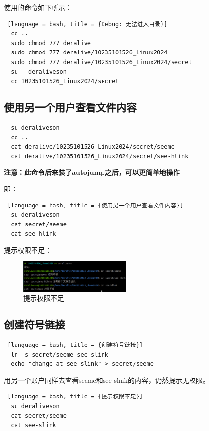 \documentclass[14pt,a4paper,UTF8,twoside]{article}
\begin{document}
使用的命令如下所示：

\begin{lstlisting} [language = bash, title = {Debug: 无法进入目录}]
  cd ..
  sudo chmod 777 deralive
  sudo chmod 777 deralive/10235101526_Linux2024
  sudo chmod 777 deralive/10235101526_Linux2024/secret
  su - deraliveson
  cd 10235101526_Linux2024/secret
\end{lstlisting}

\subsection{使用另一个用户查看文件内容}

\begin{lstlisting}
  su deraliveson
  cd ..
  cat deralive/10235101526_Linux2024/secret/seeme
  cat deralive/10235101526_Linux2024/secret/see-hlink
\end{lstlisting}

\textbf{注意：此命令后来装了autojump之后，可以更简单地操作}

即：

\begin{lstlisting} [language = bash, title = {使用另一个用户查看文件内容}]
  su deraliveson
  cat secret/seeme
  cat see-hlink
\end{lstlisting}

提示权限不足：

\begin{figure} [H]
  \centering
  \includegraphics[width=0.5\textwidth]{lec2/cantcat.png}
  \caption{提示权限不足}
  \label{fig:8}
\end{figure}

\subsection{创建符号链接}
\begin{lstlisting} [language = bash, title = {创建符号链接}]
  ln -s secret/seeme see-slink
  echo "change at see-slink" > secret/seeme
\end{lstlisting}

用另一个账户同样去查看seeme和see-slink的内容，仍然提示无权限。

\begin{lstlisting} [language = bash, title = {提示权限不足}]
  su deraliveson
  cat secret/seeme
  cat see-slink
\end{lstlisting}
\end{document}
